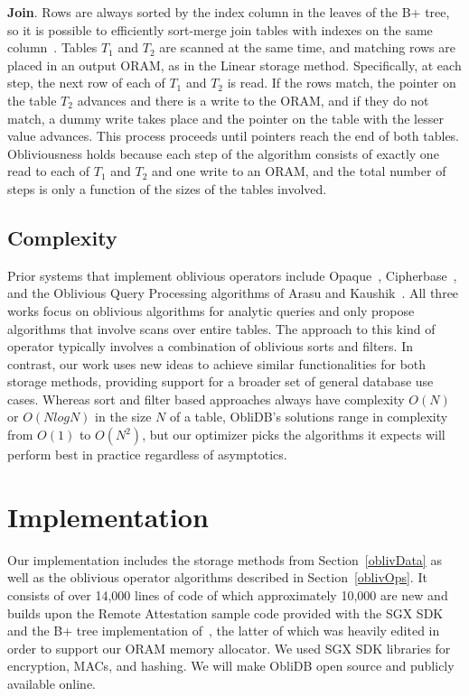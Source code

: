 \documentclass[letterpaper,twocolumn,10pt]{article}
\def\name/{ObliDB}
\begin{document}
  \noindent \textbf{Join}.
  Rows are always sorted by the index column in the leaves of the B+ tree, so it is possible to efficiently sort-merge join tables with indexes on the same column~\cite{EN10}. Tables $T_1$ and $T_2$ are scanned at the same time, and matching rows are placed in an output ORAM, as in the Linear storage method. Specifically, at each step, the next row of each of $T_1$ and $T_2$ is read. If the rows match, the pointer on the table $T_2$ advances and there is a write to the ORAM, and if they do not match, a dummy write takes place and the pointer on the table with the lesser value advances. This process proceeds until pointers reach the end of both tables. Obliviousness holds because each step of the algorithm consists of exactly one read to each of $T_1$ and $T_2$ and one write to an ORAM, and the total number of steps is only a function of the sizes of the tables involved.

\subsection{Complexity}
Prior systems that implement oblivious operators include Opaque~\cite{ZDB+17}, Cipherbase~\cite{cipherbase}, and the Oblivious Query Processing algorithms of Arasu and Kaushik~\cite{AK14}. All three works focus on oblivious algorithms for analytic queries and only propose algorithms that involve scans over entire tables. The approach to this kind of operator typically involves a combination of oblivious sorts and filters. In contrast, our work uses new ideas to achieve similar functionalities for both storage methods, providing support for a broader set of general database use cases. Whereas sort and filter based approaches always have complexity $O(N)$ or $O(N\textit{log}N)$ in the size $N$ of a table, \name/'s solutions range in complexity from $O(1)$ to $O(N^2)$, but our optimizer picks the algorithms it expects will perform best in practice regardless of asymptotics.

\section{Implementation}\label{imp}
Our implementation includes the storage methods from Section~\ref{oblivData} as well as the oblivious operator algorithms described in Section~\ref{oblivOps}. It consists of over 14,000 lines of code of which approximately 10,000 are new and builds upon the Remote Attestation sample code provided with the SGX SDK ~\cite{SGXRef} and the B+ tree implementation of~\cite{BPlus}, the latter of which was heavily edited in order to support our ORAM memory allocator. We used SGX SDK libraries for encryption, MACs, and hashing. We will make \name/ open source and publicly available online.
\end{document}
